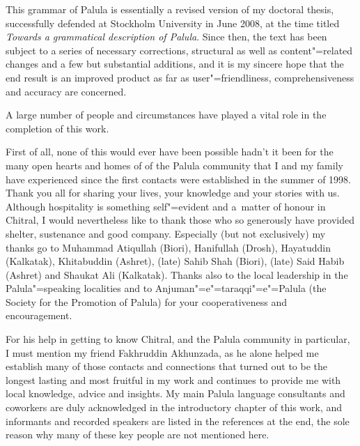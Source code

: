 \begin{refsection}

This grammar of Palula is essentially a revised version of my doctoral thesis, successfully defended at Stockholm University in June 2008, at the time titled \textit{Towards a grammatical description of Palula}. Since then, the text has been subject to a series of necessary corrections, structural as well as content"=related changes and a few but substantial additions, and it is my sincere hope that the end result is an improved product as far as user"=friendliness, comprehensiveness and accuracy are concerned.


A large number of people and circumstances have played a vital role in the completion of this work.


First of all, none of this would ever have been possible hadn’t it been for the many open hearts and homes of of the Palula community that I and my family have experienced since the first contacts were established in the summer of 1998. Thank you all for sharing your lives, your knowledge and your stories with us. Although hospitality is something self"=evident and a~matter of honour in Chitral, I would nevertheless like to thank those who so generously have provided shelter, sustenance and good company. Especially (but not exclusively) my thanks go to Muhammad Atiqullah (Biori), Hanifullah (Drosh), Hayatuddin (Kalkatak), Khitabuddin (Ashret), (late) Sahib Shah (Biori), (late) Said Habib (Ashret) and Shaukat Ali (Kalkatak). Thanks also to the local leadership in the Palula"=speaking localities and to Anjuman"=e"=taraqqi"=e"=Palula (the Society for the Promotion of Palula) for your cooperativeness and encouragement. 


For his help in getting to know Chitral, and the Palula community in particular, I must mention my friend Fakhruddin Akhunzada, as he alone helped me establish many of those contacts and connections that turned out to be the longest lasting and most fruitful in my work and continues to provide me with local knowledge, advice and insights. My main Palula language consultants and coworkers are duly acknowledged in the introductory chapter of this work, and informants and recorded speakers are listed in the references at the end, the sole reason why many of these key people are not mentioned here.



\end{refsection}
